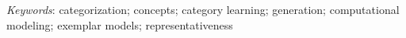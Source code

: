 \documentclass[12pt]{article}
\begin{document}
\setlength\parindent{0.5in}
{\em Keywords}: categorization; concepts; category learning; generation;
computational modeling; exemplar models; representativeness
\clearpage





\end{document}
